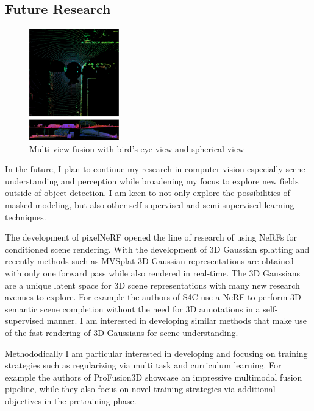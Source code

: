 \subsection{\textbf{Future Research}}
\begin{figure}
    \includegraphics[width=110pt]{pic/fusion.png}
    \mainfont\fontsize{9pt}{9pt}\selectfont\caption{ \mainfont\fontsize{9pt}{9pt}\selectfont Multi view fusion with bird's eye view and spherical view}
    \label{fig:fusion}
    \end{figure}
In the future, I plan to continue my research in computer vision especially scene understanding and perception while broadening my focus to explore new fields outside of object detection. I am keen to not only explore the possibilities of masked modeling, but also other self-supervised and semi supervised learning techniques.  

The development of pixelNeRF \cite{pixelnerf} opened the line of research of using NeRFs for conditioned scene rendering. With the development of 3D Gaussian splatting and recently methods such as MVSplat \cite{mvsplat} 3D Gaussian representations are obtained with only one forward pass while also rendered in real-time. The 3D Gaussians are a unique latent space for 3D scene representations with many new research avenues to explore. For example the authors of S4C \cite{s4c} use a NeRF to perform 3D semantic scene completion without the need for 3D annotations in a self-supervised manner. I am interested in developing similar methods that make use of the fast rendering of 3D Gaussians for scene understanding.

Methododically I am particular interested in developing and focusing on training strategies such as regularizing via multi task and curriculum learning. For example the authors of ProFusion3D \cite{valada} showcase an impressive multimodal fusion pipeline, while they also focus on novel training strategies via additional objectives in the pretraining phase. 